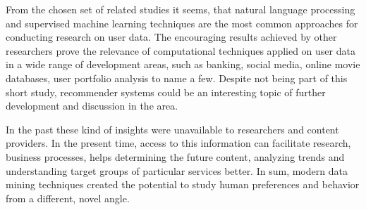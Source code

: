 From the chosen set of related studies it seems, that natural language processing and supervised machine learning techniques are the most common approaches for conducting research on user data. The encouraging results achieved by other researchers prove the relevance of computational techniques applied on user data in a wide range of development areas, such as banking, social media, online movie databases, user portfolio analysis to name a few. Despite not being part of this short study, recommender systems could be an interesting topic of further development and discussion in the area.

In the past these kind of insights were unavailable to researchers and content providers. In the present time, access to this information can facilitate research, business processes, helps determining the future content, analyzing trends and understanding target groups of particular services better. In sum, modern data mining techniques created the potential to study human preferences and behavior from a different, novel angle.

